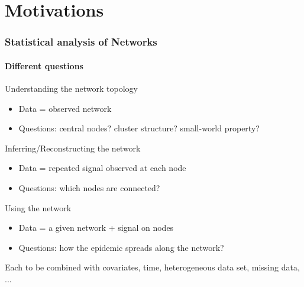 
\section*{Motivations}

\begin{frame}
  \frametitle{Statistical analysis of Networks}
  \framesubtitle{Different questions}

  \begin{block}{Understanding the network topology}
    \vspace{-.25cm}
    \begin{itemize}
    \item Data = observed network
    \item Questions: central nodes? cluster structure? small-world property?
    \end{itemize}
  \end{block}
  
  \vfill

  \begin{alertblock}{Inferring/Reconstructing the network}
    \vspace{-.25cm}
    \begin{itemize}
    \item Data = repeated signal observed at each node
    \item Questions: which nodes are connected?
    \end{itemize}
  \end{alertblock}

  \vfill

  \begin{block}{Using the network}
    \vspace{-.25cm}
    \begin{itemize}
    \item Data = a given network + signal on nodes
    \item Questions: how the epidemic spreads along the network?
    \end{itemize}
  \end{block}

  \vfill

  \begin{block}{\alert{Each to be combined with}}
    covariates, time, heterogeneous data set, missing data, ...  
  \end{block}
\end{frame}

